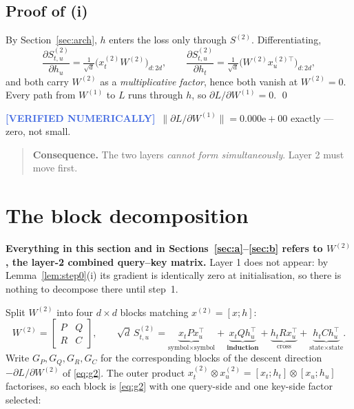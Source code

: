 \documentclass[11pt,a4paper]{article}
\theoremstyle{plain}
\theoremstyle{definition}
\newcommand{\NUM}{\textcolor{RoyalBlue}{\textbf{[VERIFIED NUMERICALLY]}}}
\newcommand{\1}{\mathbf{1}}
\begin{document}
\subsection{Proof of (i)}

By Section~\ref{sec:arch}, $h$ enters the loss only through $S^{(2)}$. Differentiating,
\begin{equation}
\frac{\partial S^{(2)}_{t,u}}{\partial h_u}
=\tfrac{1}{\sqrt d}\bigl(x^{(2)}_tW^{(2)}\bigr)_{d:2d},
\qquad
\frac{\partial S^{(2)}_{t,u}}{\partial h_t}
=\tfrac{1}{\sqrt d}\bigl(W^{(2)}x^{(2)\top}_u\bigr)_{d:2d},
\end{equation}
and both carry $W^{(2)}$ as a \emph{multiplicative factor}, hence both vanish at $W^{(2)}=0$.
Every path from $W^{(1)}$ to $L$ runs through $h$, so $\partial L/\partial W^{(1)}=0$. \qed

\medskip\noindent\NUM\ $\lVert\partial L/\partial W^{(1)}\rVert=0.000\mathrm{e}{+}00$ exactly ---
zero, not small.

\begin{quote}
\textbf{Consequence.} The two layers \emph{cannot form simultaneously}. Layer 2 must move first.
\end{quote}

\section{The block decomposition}

\textbf{Everything in this section and in Sections~\ref{sec:a}--\ref{sec:b} refers to
$W^{(2)}$, the layer-2 combined query--key matrix.} Layer 1 does not appear: by
Lemma~\ref{lem:step0}(i) its gradient is identically zero at initialisation, so there is nothing
to decompose there until step~1.

Split $W^{(2)}$ into four $d\times d$ blocks matching $x^{(2)}=[x;h]$:
\begin{equation}
W^{(2)}=\begin{bmatrix}P&Q\\R&C\end{bmatrix},\qquad
\sqrt d\,S^{(2)}_{t,u}
=\underbrace{x_tPx_u^\top}_{\text{symbol}\times\text{symbol}}
+\underbrace{x_tQh_u^\top}_{\textbf{induction}}
+\underbrace{h_tRx_u^\top}_{\text{cross}}
+\underbrace{h_tCh_u^\top}_{\text{state}\times\text{state}} .
\end{equation}
Write $G_P,G_Q,G_R,G_C$ for the corresponding blocks of the descent direction
$-\partial L/\partial W^{(2)}$ of \eqref{eq:g2}. The outer product
$x^{(2)}_t\otimes x^{(2)}_u=[x_t;h_t]\otimes[x_u;h_u]$ factorises, so each block is
\eqref{eq:g2} with one query-side and one key-side factor selected:
\end{document}
